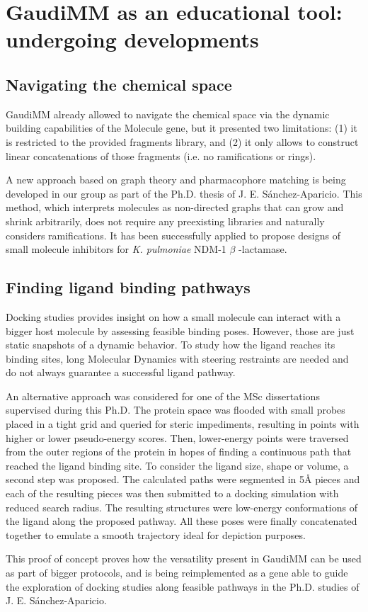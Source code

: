 \chapter[GaudiMM as an educational tool: undergoing developments]{GaudiMM as an educational tool:\\ undergoing developments}
\label{chap:appendix-b}


\section{Navigating the chemical space}
GaudiMM already allowed to navigate the chemical space via the dynamic building capabilities of the Molecule gene, but it presented two limitations: (1) it is restricted to the provided fragments library, and (2) it only allows to construct linear concatenations of those fragments (i.e. no ramifications or rings).

A new approach based on graph theory and pharmacophore matching is being developed in our group as part of the Ph.D. thesis of J. E. Sánchez-Aparicio. This method, which interprets molecules as non-directed graphs that can grow and shrink arbitrarily, does not require any preexisting libraries and naturally considers ramifications. It has been successfully applied to propose designs of small molecule inhibitors for \textit{K. pulmoniae} NDM-1 $ \beta $ -lactamase.

\section{Finding ligand binding pathways}
Docking studies provides insight on how a small molecule can interact with a bigger host molecule by assessing feasible binding poses. However, those are just static snapshots of a dynamic behavior. To study how the ligand reaches its binding sites, long Molecular Dynamics with steering restraints are needed and do not always guarantee a successful ligand pathway.

An alternative approach was considered for one of the MSc dissertations supervised during this Ph.D. The protein space was flooded with small probes placed in a tight grid and queried for steric impediments, resulting in points with higher or lower pseudo-energy scores. Then, lower-energy points were traversed from the outer regions of the protein in hopes of finding a continuous path that reached the ligand binding site. To consider the ligand size, shape or volume, a second step was proposed. The calculated paths were segmented in 5Å pieces and each of the resulting pieces was then submitted to a docking simulation with reduced search radius. The resulting structures were low-energy conformations of the ligand along the proposed pathway. All these poses were finally concatenated together to emulate a smooth trajectory ideal for depiction purposes.

This proof of concept proves how the versatility present in GaudiMM can be used as part of bigger protocols, and is being reimplemented as a gene able to guide the exploration of docking studies along feasible pathways in the Ph.D. studies of J. E. Sánchez-Aparicio.
